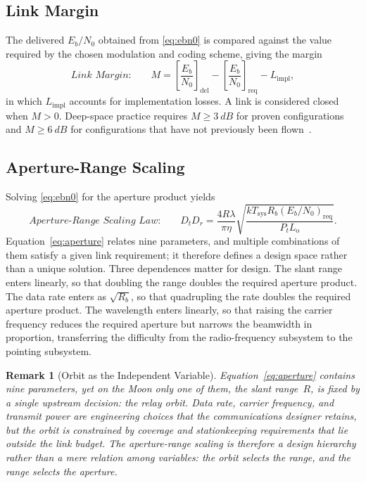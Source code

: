 \documentclass[11pt,a4paper]{article}
\newtheorem{remark}{Remark}
\begin{document}
\subsection{Link Margin}
The delivered $E_b/N_0$ obtained from \eqref{eq:ebn0} is compared against the value required by the chosen modulation and coding scheme, giving the margin
\begin{equation}
\label{eq:margin}
\textit{Link Margin:}\qquad
M = \left[\frac{E_b}{N_0}\right]_{\mathrm{del}} - \left[\frac{E_b}{N_0}\right]_{\mathrm{req}} - L_{\mathrm{impl}},
\end{equation}
in which $L_{\mathrm{impl}}$ accounts for implementation losses. A link is considered closed when $M > 0$. Deep-space practice requires $M \geq \SI{3}{dB}$ for proven configurations and $M \geq \SI{6}{dB}$ for configurations that have not previously been flown~\cite{yuen_descanso}.

\subsection{Aperture-Range Scaling}
Solving \eqref{eq:ebn0} for the aperture product yields
\begin{equation}
\label{eq:aperture}
\textit{Aperture-Range Scaling Law:}\qquad
D_t D_r = \frac{4 R \lambda}{\pi \eta} \sqrt{\frac{k T_{\mathrm{sys}} R_b \left(E_b/N_0\right)_{\mathrm{req}}}{P_t L_{\mathrm{o}}}}.
\end{equation}
Equation~\eqref{eq:aperture} relates nine parameters, and multiple combinations of them satisfy a given link requirement; it therefore defines a design space rather than a unique solution. Three dependences matter for design. The slant range enters linearly, so that doubling the range doubles the required aperture product. The data rate enters as $\sqrt{R_b}$, so that quadrupling the rate doubles the required aperture product. The wavelength enters linearly, so that raising the carrier frequency reduces the required aperture but narrows the beamwidth in proportion, transferring the difficulty from the radio-frequency subsystem to the pointing subsystem.

\begin{remark}[Orbit as the Independent Variable]
\label{rem:orbit}
Equation~\eqref{eq:aperture} contains nine parameters, yet on the Moon only one of them, the slant range~$R$, is fixed by a single upstream decision: the relay orbit. Data rate, carrier frequency, and transmit power are engineering choices that the communications designer retains, but the orbit is constrained by coverage and stationkeeping requirements that lie outside the link budget. The aperture-range scaling is therefore a design hierarchy rather than a mere relation among variables: the orbit selects the range, and the range selects the aperture.
\end{remark}
\end{document}
